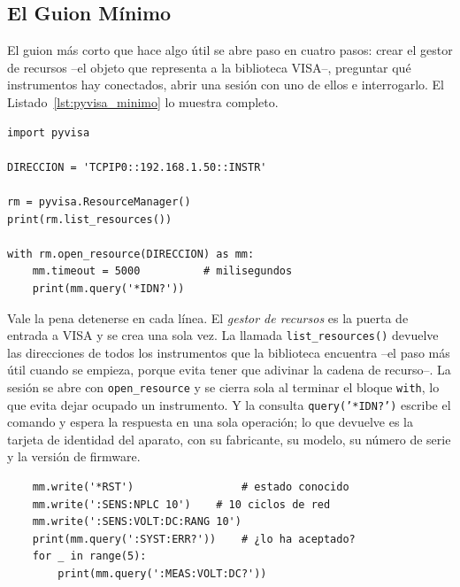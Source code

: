 \subsection{El Guion Mínimo}\label{sub:guion_minimo}

El guion más corto que hace algo útil se abre paso en cuatro pasos: crear el gestor de recursos --el objeto que representa a la biblioteca VISA--, preguntar qué instrumentos hay conectados, abrir una sesión con uno de ellos e interrogarlo. El Listado~\ref{lst:pyvisa_minimo} lo muestra completo.

\begin{listing}
\small
\begin{verbatim}
import pyvisa

DIRECCION = 'TCPIP0::192.168.1.50::INSTR'

rm = pyvisa.ResourceManager()
print(rm.list_resources())

with rm.open_resource(DIRECCION) as mm:
    mm.timeout = 5000          # milisegundos
    print(mm.query('*IDN?'))
\end{verbatim}
\caption[Guion mínimo de control de un instrumento con PyVISA.]{Guion mínimo: gestor de recursos, inventario de instrumentos, apertura de la sesión e identificación. La sesión se cierra sola al salir del bloque \texttt{with}.}\label{lst:pyvisa_minimo}
\end{listing}

Vale la pena detenerse en cada línea. El \emph{gestor de recursos} es la puerta de entrada a VISA y se crea una sola vez. La llamada \texttt{list\_resources()} devuelve las direcciones de todos los instrumentos que la biblioteca encuentra --el paso más útil cuando se empieza, porque evita tener que adivinar la cadena de recurso--. La sesión se abre con \texttt{open\_resource} y se cierra sola al terminar el bloque \texttt{with}, lo que evita dejar ocupado un instrumento. Y la consulta \texttt{query('*IDN?')} escribe el comando y espera la respuesta en una sola operación; lo que devuelve es la tarjeta de identidad del aparato, con su fabricante, su modelo, su número de serie y la versión de firmware.

\begin{listing}
\small
\begin{verbatim}
    mm.write('*RST')                 # estado conocido
    mm.write(':SENS:NPLC 10')    # 10 ciclos de red
    mm.write(':SENS:VOLT:DC:RANG 10')
    print(mm.query(':SYST:ERR?'))    # ¿lo ha aceptado?
    for _ in range(5):
        print(mm.query(':MEAS:VOLT:DC?'))
\end{verbatim}
\caption[Configuración y lectura de un multímetro desde PyVISA.]{Continuación del guion anterior, dentro de la misma sesión. Los comandos que \emph{no} llevan interrogante se envían con \texttt{write}, y solo los que lo llevan se leen con \texttt{query}; la impresión de \texttt{:SYST:ERR?} comprueba que el instrumento ha aceptado la configuración antes de empezar a medir.}\label{lst:pyvisa_config}
\end{listing}

